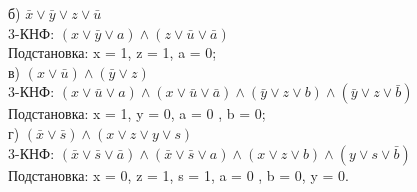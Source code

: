\documentclass[12pt,a4paper]{article}
\begin{document}
\begin{enumerate}
\begin{itemize}
  б) $\bar x \vee \bar y \vee z \vee \bar u$\\
  3-КНФ: $( x\vee \bar y \vee a) \wedge (z \vee \bar u \vee \bar a)$\\
  Подстановка: x = 1, z = 1, a = 0;\\
  
  в) $(x\vee \bar u) \wedge (\bar y \vee z)$\\
  3-КНФ: $( x\vee \bar u \vee a) \wedge ( x\vee \bar u \vee \bar a) \wedge (\bar y \vee z \vee b) \wedge (\bar y \vee z \vee \bar b)$\\
  Подстановка: x = 1, y = 0, a = 0 , b = 0;\\
  
  г) $(\bar x \vee \bar s) \wedge (x \vee z \vee y \vee s)$\\
  3-КНФ: $ (\bar x \vee \bar s \vee \bar a) \wedge (\bar x \vee \bar s \vee a) \wedge (x \vee z \vee b) \wedge (y \vee s \vee \bar b)$\\
  Подстановка: x = 0, z = 1, s = 1, a = 0 , b = 0, y = 0.\\
  
  \end{itemize}
\end{enumerate}
\end{document}
